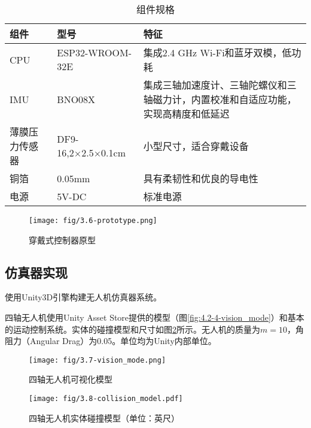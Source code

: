 \begin{table}
    \centering
    \caption{\label{tab:hardware}组件规格}
    \begin{tabular}{>{\raggedright\arraybackslash}p{2.5cm} p{4cm} p{4cm}}
        \toprule
        \textbf{组件} & \textbf{型号}        & \textbf{特征}                                                  \\
        \midrule
        CPU         & ESP32-WROOM-32E    & 集成2.4 GHz Wi-Fi和蓝牙双模，低功耗                                   \\ \midrule
        IMU       & BNO08X             & 集成三轴加速度计、三轴陀螺仪和三轴磁力计，内置校准和自适应功能，实现高精度和低延迟                 \\ \midrule
        薄膜压力传感器     & DF9-16,2×2.5×0.1cm & 小型尺寸，适合穿戴设备                                                \\ \midrule
        铜箔          & 0.05mm             & 具有柔韧性和优良的导电性                                               \\ \midrule
        电源          & 5V-DC              & 标准电源                                                         \\
        \bottomrule
    \end{tabular}
\end{table}

\begin{figure}[htbp]
    \centering
    \texttt{[image:  fig/3.6-prototype.png]}
    \caption{穿戴式控制器原型}
    \label{fig:4.2-2-prototype}
\end{figure}

\clearpage

\subsection{仿真器实现}\label{ssec:simulator}

使用Unity3D引擎构建无人机仿真器系统。

四轴无人机使用Unity Asset Store提供的模型（图\ref{fig:4.2-4-vision_mode}）和基本的运动控制系统。实体的碰撞模型和尺寸如图\ref{fig:4.2-3-collision_model}所示。无人机的质量为$m=10$，角阻力（Angular Drag）为0.05。单位均为Unity内部单位。

\begin{figure}[htbp]
    \centering
    \texttt{[image:  fig/3.7-vision\_mode.png]}
    \caption{四轴无人机可视化模型}
    \label{fig:4.2-4-vision_mode}

    \texttt{[image:  fig/3.8-collision\_model.pdf]}
    \caption{四轴无人机实体碰撞模型（单位：英尺）}
    \label{fig:4.2-3-collision_model}
\end{figure}

